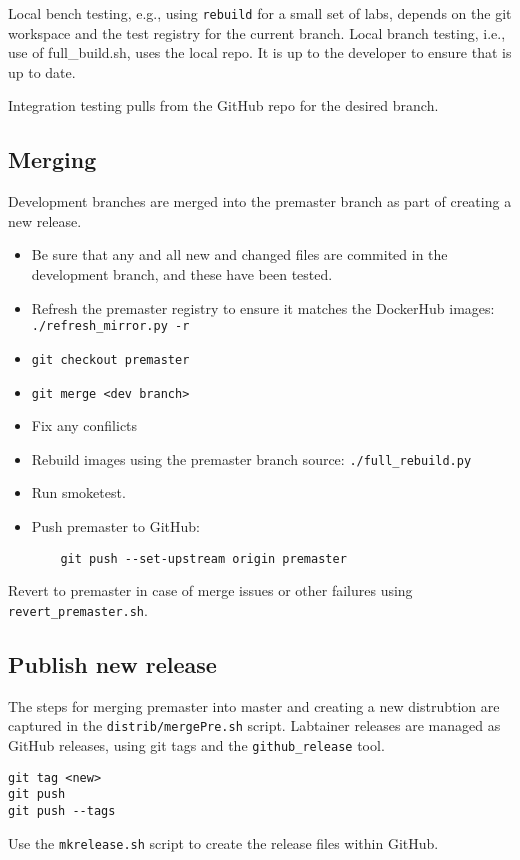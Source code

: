 \documentclass[12pt]{article}
\begin{document}
Local bench testing, e.g., using {\tt rebuild} for a small set of labs, depends on the git workspace and the test registry for the current branch.
Local branch testing, i.e., use of full\_build.sh, uses the local repo.  It is up to the developer to ensure that is up to date.

Integration testing pulls from the GitHub repo for the desired branch.


\subsection{Merging}
Development branches are merged into the premaster branch as part of creating a new release.
\begin{itemize}
\item Be sure that any and all new and changed files are commited in the development branch, and these have been tested.
\item Refresh the premaster registry to ensure it matches the DockerHub images: {\tt ./refresh\_mirror.py -r}
\item {\tt git checkout premaster}
\item {\tt git merge <dev branch>}
\item Fix any confilicts
\item Rebuild images using the premaster branch source: {\tt ./full\_rebuild.py}
\item Run smoketest.
\item Push premaster to GitHub: 
\begin{verbatim}
    git push --set-upstream origin premaster
\end{verbatim}
\end{itemize}

Revert to premaster in case of merge issues or other failures using {\tt revert\_premaster.sh}.

\subsection{Publish new release}
The steps for merging premaster into master and creating a new distrubtion are captured in the {\tt distrib/mergePre.sh} script.
Labtainer releases are managed as GitHub releases, using git tags and the {\tt github\_release} tool.

\begin{verbatim}
git tag <new>
git push
git push --tags
\end{verbatim}

Use the {\tt mkrelease.sh} script to create the release files within GitHub.
\end{document}
